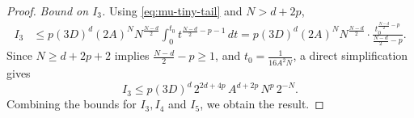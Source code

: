 \begin{proof}
\emph{Bound on $I_3$.} Using \eqref{eq:mu-tiny-tail} and $N>d+2p$,
\[
\begin{aligned}
I_3
&\le p(3D)^d (2A)^N N^{\frac{N-d}{2}}
\int_0^{t_0} t^{\frac{N-d}{2}-p-1}\,dt
= p(3D)^d (2A)^N N^{\frac{N-d}{2}} \cdot \frac{t_0^{\frac{N-d}{2}-p}}{\frac{N-d}{2}-p}.
\end{aligned}
\]
Since $N\ge d+2p+2$ implies $\frac{N-d}{2}-p\ge 1$, and $t_0=\frac{1}{16A^2N}$, a direct simplification gives
\[
I_3 \le p(3D)^d \,2^{2d+4p}\,A^{d+2p}\,N^p\,2^{-N}.
\]
Combining the bounds for $I_3, I_4$ and $I_5$, we obtain the result.
\end{proof}





